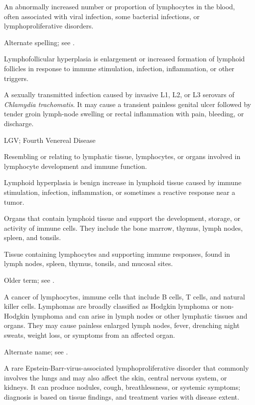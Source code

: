  An abnormally increased number or proportion of lymphocytes in the blood, often associated with viral infection, some bacterial infections, or lymphoproliferative disorders.

 Alternate spelling; see .

 Lymphofollicular hyperplasia is enlargement or increased formation of lymphoid follicles in response to immune stimulation, infection, inflammation, or other triggers.

 A sexually transmitted infection caused by invasive L1, L2, or L3 serovars of \textit{Chlamydia trachomatis}. It may cause a transient painless genital ulcer followed by tender groin lymph-node swelling or rectal inflammation with pain, bleeding, or discharge.

\synonyms
LGV; Fourth Venereal Disease

 Resembling or relating to lymphatic tissue, lymphocytes, or organs involved in lymphocyte development and immune function.

 Lymphoid hyperplasia is benign increase in lymphoid tissue caused by immune stimulation, infection, inflammation, or sometimes a reactive response near a tumor.

 Organs that contain lymphoid tissue and support the development, storage, or activity of immune cells. They include the bone marrow, thymus, lymph nodes, spleen, and tonsils.

 Tissue containing lymphocytes and supporting immune responses, found in lymph nodes, spleen, thymus, tonsils, and mucosal sites.

 Older term; see .

 A cancer of lymphocytes, immune cells that include B cells, T cells, and natural killer cells. Lymphomas are broadly classified as Hodgkin lymphoma or non-Hodgkin lymphoma and can arise in lymph nodes or other lymphatic tissues and organs. They may cause painless enlarged lymph nodes, fever, drenching night sweats, weight loss, or symptoms from an affected organ.

 Alternate name; see .

 A rare Epstein-Barr-virus-associated lymphoproliferative disorder that commonly involves the lungs and may also affect the skin, central nervous system, or kidneys. It can produce nodules, cough, breathlessness, or systemic symptoms; diagnosis is based on tissue findings, and treatment varies with disease extent.

